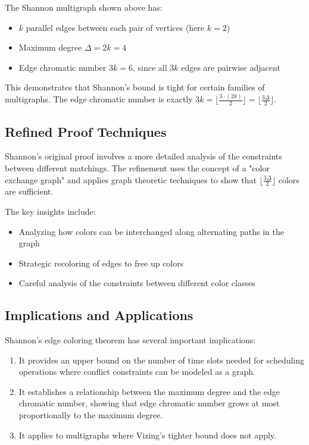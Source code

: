 \documentclass{article}
\theoremstyle{definition}
\begin{document}
The Shannon multigraph shown above has:
\begin{itemize}
    \item $k$ parallel edges between each pair of vertices (here $k = 2$)
    \item Maximum degree $\Delta = 2k = 4$
    \item Edge chromatic number $3k = 6$, since all $3k$ edges are pairwise adjacent
\end{itemize}

This demonstrates that Shannon's bound is tight for certain families of multigraphs. The edge chromatic number is exactly $3k = \lfloor \frac{3 \cdot (2k)}{2} \rfloor = \lfloor \frac{3\Delta}{2} \rfloor$.

\subsection*{Refined Proof Techniques}

Shannon's original proof involves a more detailed analysis of the constraints between different matchings. The refinement uses the concept of a "color exchange graph" and applies graph theoretic techniques to show that $\lfloor \frac{3\Delta}{2} \rfloor$ colors are sufficient.

The key insights include:
\begin{itemize}
    \item Analyzing how colors can be interchanged along alternating paths in the graph
    \item Strategic recoloring of edges to free up colors
    \item Careful analysis of the constraints between different color classes
\end{itemize}

\subsection*{Implications and Applications}

Shannon's edge coloring theorem has several important implications:

\begin{enumerate}
    \item It provides an upper bound on the number of time slots needed for scheduling operations where conflict constraints can be modeled as a graph.
    \item It establishes a relationship between the maximum degree and the edge chromatic number, showing that edge chromatic number grows at most proportionally to the maximum degree.
    \item It applies to multigraphs where Vizing's tighter bound does not apply.
\end{enumerate}
\end{document}
